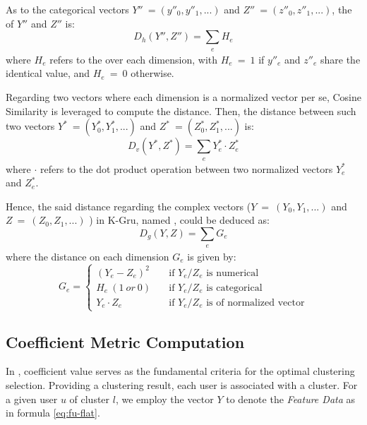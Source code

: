 As to the categorical vectors $Y''\ = (y''_0, y''_1, ...)$ and  $Z''\ = (z''_0, z''_1, ...)$, the \hd{}  of $Y''$ and $Z''$ is:
%
\begin{equation}
\label{eq:hd}
D_h(Y'', Z'') = \sum_{\substack{e}} H_e
\end{equation} 
where $H_e$ refers to the \hd{} over each dimension, with $H_e\ =\ 1$ if $y''_e$ and $z''_e$ share the identical value, and $H_e\ =\ 0$ otherwise.

Regarding two vectors where each dimension is a normalized vector per se, Cosine Similarity  is leveraged to compute the distance.
Then, the distance between such two vectors $Y^{\ast}\ = (Y^{\ast}_0, Y^{\ast}_1, ...)$ and $Z^{\ast}\ = (Z^{\ast}_0, Z^{\ast}_1, ...)$ is:
%
\begin{equation}
\label{eq:vd}
D_v(Y^{\ast}, Z^{\ast}) = \sum_{\substack{e}} Y^{\ast}_e \cdot Z^{\ast}_e
\end{equation} 
where $\cdot$ refers to the dot product operation between two normalized vectors $Y^{\ast}_e$ and $Z^{\ast}_e$.

Hence, the said distance regarding the complex vectors ($Y\ =\ (Y_0, Y_1, ...)$ and $Z\ =\ (Z_0, Z_1, ...)$ ) in K-Gru, named \gd{}, could be deduced as:
%
\begin{equation}
\label{eq:gd}
D_g(Y, Z) = \sum_{\substack{e}} G_e
\end{equation}
where the distance on each dimension $G_e$ is given by:
%
\begin{equation}
\label{eq:ge}
G_e =
  \begin{cases}
    (Y_e - Z_e)^2       & \quad \text{if } Y_e/Z_e \text{ is numerical}\\
    H_e\ (1\ or\ 0)       	& \quad \text{if } Y_e/Z_e \text{ is categorical}\\
    Y_e \cdot Z_e  		& \quad \text{if } Y_e/Z_e \text{ is of normalized vector}
  \end{cases}
\end{equation}


\subsection{Coefficient Metric Computation}
\label{sec:compu}

In \sys{}, coefficient value serves as the fundamental criteria for the optimal clustering selection.
Providing a clustering result, each user is associated with a cluster.
For a given user $u$ of cluster $l$, we employ the vector $Y$ to denote the \textit{Feature Data} as in formula \ref{eq:fu-flat}.


